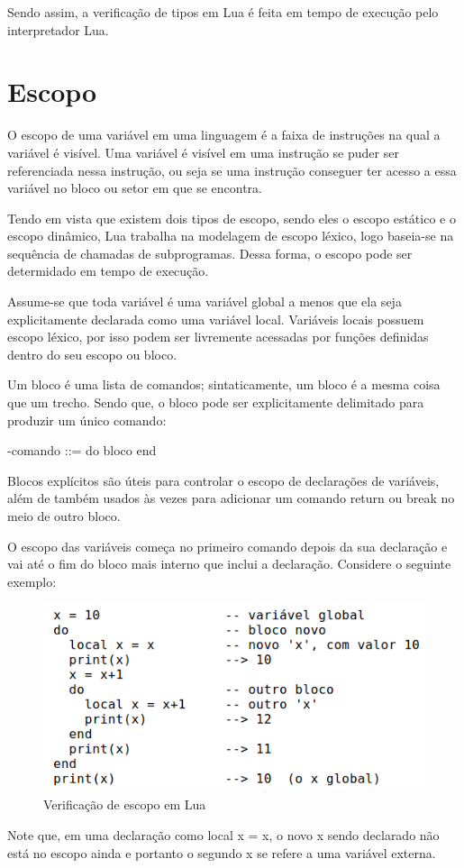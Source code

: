 \documentclass[
12pt, %
openright, %
oneside, %
a4paper, %
english, %
brazil, %
]{abntex2}
\begin{document}
Sendo assim, a verificação de tipos em Lua é feita em tempo de execução pelo interpretador Lua.

\section{Escopo}
O escopo de uma variável em uma linguagem é a faixa de instruções na qual a variável é visível. Uma variável é visível em uma instrução se puder ser referenciada nessa instrução, ou seja se uma instrução conseguer ter acesso a essa variável no bloco ou setor em que se encontra.

Tendo em vista que existem dois tipos de escopo, sendo eles o escopo estático e o escopo dinâmico, Lua trabalha na modelagem de escopo léxico, logo baseia-se na sequência de chamadas de subprogramas. Dessa forma, o escopo pode ser determidado em tempo de execução.

Assume-se que toda variável é uma variável global a menos que ela seja explicitamente declarada como uma variável local. Variáveis locais possuem escopo léxico, por isso podem ser livremente acessadas por funções definidas dentro do seu escopo ou bloco.

Um bloco é uma lista de comandos; sintaticamente, um bloco é a mesma coisa que um trecho. Sendo que, o bloco pode ser explicitamente delimitado para produzir um único comando:

-comando ::= do bloco end

Blocos explícitos são úteis para controlar o escopo de declarações de variáveis, além de também usados às vezes para adicionar um comando return ou break no meio de outro bloco.

O escopo das variáveis começa no primeiro comando depois da sua declaração e vai até o fim do bloco mais interno que inclui a declaração. Considere o seguinte exemplo:

\begin{figure}[H]
\centering
\includegraphics[width=0.5\linewidth]{imagens/imagem3.png}
\caption{Verificação de escopo em Lua}
\end{figure}

Note que, em uma declaração como local x = x, o novo x sendo declarado não está no escopo ainda e portanto o segundo x se refere a uma variável externa.
\end{document}
